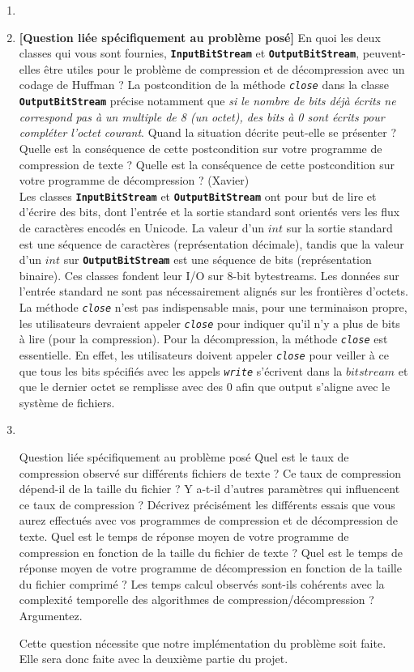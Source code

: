 \documentclass[11pt]{article}
\begin{document}
\begin{enumerate}
\item

\item \textbf{[Question liée spécifiquement au problème posé]} En quoi les deux classes qui
vous sont fournies, \texttt{\textbf{InputBitStream}} et \texttt{\textbf{OutputBitStream}}, peuvent-elles
être utiles pour le problème de compression et de décompression avec un codage
de Huffman ? La postcondition de la méthode \texttt{\textit{close}} dans la classe \texttt{\textbf{OutputBitStream}}
précise notamment que \textit{si le nombre de bits déjà écrits ne correspond pas à un
multiple de 8 (un octet), des bits à 0 sont écrits pour compléter l’octet courant}.
Quand la situation décrite peut-elle se présenter ? Quelle est la conséquence de
cette postcondition sur votre programme de compression de texte ? Quelle est la
conséquence de cette postcondition sur votre programme de décompression ? (Xavier)\\

Les classes \texttt{\textbf{InputBitStream}} et \texttt{\textbf{OutputBitStream}} ont pour but de lire et d'écrire des bits, dont l'entrée et la sortie standard sont orientés vers les flux de caractères encodés en Unicode. La valeur d'un $int$ sur la sortie standard est une séquence de caractères (représentation décimale), tandis que la valeur d'un $int$ sur \texttt{\textbf{OutputBitStream}} est une séquence de bits (représentation binaire). Ces classes  fondent leur I/O sur 8-bit bytestreams. Les données sur l'entrée standard ne sont pas nécessairement alignés sur les frontières d'octets. La méthode \texttt{\textit{close}} n'est pas indispensable mais, pour une terminaison propre, les utilisateurs devraient appeler \texttt{\textit{close}} pour indiquer qu'il n'y a plus de bits à lire (pour la compression). Pour la décompression, la méthode \texttt{\textit{close}} est essentielle. En effet, les utilisateurs doivent appeler \texttt{\textit{close}} pour veiller à ce que tous les bits spécifiés avec les appels \texttt{\textit{write}} s'écrivent dans la $bitstream$ et que le dernier octet se remplisse avec des 0 afin que output s'aligne avec le système de fichiers.\\

\item
\item [Question liée spécifiquement au problème posé] Quel est le taux de compression
observé sur différents fichiers de texte ? Ce taux de compression dépend-il
de la taille du fichier ? Y a-t-il d’autres paramètres qui influencent ce taux de
compression ? Décrivez précisément les différents essais que vous aurez effectués
avec vos programmes de compression et de décompression de texte.
Quel est le temps de réponse moyen de votre programme de compression en
fonction de la taille du fichier de texte ? Quel est le temps de réponse moyen de
votre programme de décompression en fonction de la taille du fichier comprimé ?
Les temps calcul observés sont-ils cohérents avec la complexité temporelle
des algorithmes de compression/décompression ? Argumentez.

Cette question nécessite que notre implémentation du problème soit faite. 
Elle sera donc faite avec la deuxième partie du projet.

\end{enumerate}
\end{document}
